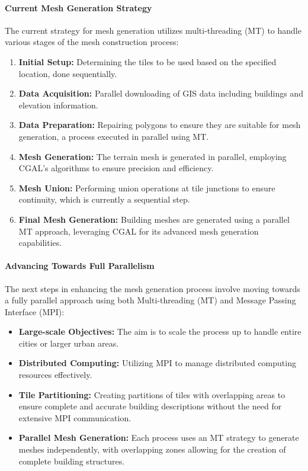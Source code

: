 \documentclass[runningheads]{llncs}
\begin{document}
\paragraph{Current Mesh Generation Strategy}
The current strategy for mesh generation utilizes multi-threading (MT) to handle various stages of the mesh construction process:
\begin{enumerate}
    \item \textbf{Initial Setup:} Determining the tiles to be used based on the specified location, done sequentially.
    \item \textbf{Data Acquisition:} Parallel downloading of GIS data including buildings and elevation information.
    \item \textbf{Data Preparation:} Repairing polygons to ensure they are suitable for mesh generation, a process executed in parallel using MT.
    \item \textbf{Mesh Generation:} The terrain mesh is generated in parallel, employing CGAL's algorithms to ensure precision and efficiency.
    \item \textbf{Mesh Union:} Performing union operations at tile junctions to ensure continuity, which is currently a sequential step.
    \item \textbf{Final Mesh Generation:} Building meshes are generated using a parallel MT approach, leveraging CGAL for its advanced mesh generation capabilities.
\end{enumerate}

\paragraph{Advancing Towards Full Parallelism}
The next steps in enhancing the mesh generation process involve moving towards a fully parallel approach using both Multi-threading (MT) and Message Passing Interface (MPI):
\begin{itemize}
    \item \textbf{Large-scale Objectives:} The aim is to scale the process up to handle entire cities or larger urban areas.
    \item \textbf{Distributed Computing:} Utilizing MPI to manage distributed computing resources effectively.
    \item \textbf{Tile Partitioning:} Creating partitions of tiles with overlapping areas to ensure complete and accurate building descriptions without the need for extensive MPI communication.
    \item \textbf{Parallel Mesh Generation:} Each process uses an MT strategy to generate meshes independently, with overlapping zones allowing for the creation of complete building structures.
\end{itemize}
\end{document}
